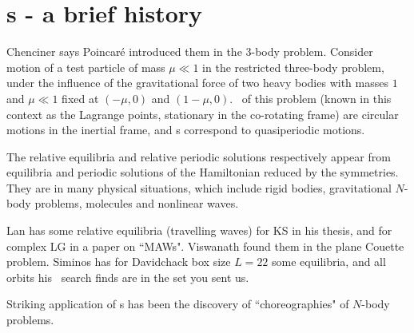 %


\section{{\Rpo s} - a brief history}

Chenciner
says Poincar\'e introduced them in the 3-body problem.
Consider motion of a test particle of mass
$\mu \ll 1$ in the
restricted three-body problem,
under the
influence of the gravitational force of two heavy bodies with masses $1$ and
$\mu \ll 1$ fixed at $(-\mu,0)$ and $(1-\mu,0)$. \Reqv\ of this problem
(known in this context as the Lagrange points, stationary in
the co-rotating frame) are circular motions in the inertial frame,
and {\rpo s} correspond to quasiperiodic motions. 

The relative equilibria and relative periodic solutions 
respectively appear from
equilibria and periodic solutions of the Hamiltonian reduced by the symmetries.
They are in many physical situations, which include rigid bodies, gravitational
$N$-body problems, molecules and nonlinear waves.

Lan has some relative equilibria (travelling waves) for KS in his
thesis, %
 and for complex LG in a paper on ``MAWs".
Viswanath %
found them in the plane Couette problem.
Siminos has for Davidchack box size $L=22$ some equilibria, and all
orbits his \rpo\ search finds are in the set you sent us.

Striking application of \rpo s has been the discovery
of ``choreographies" of $N$-body problems.


